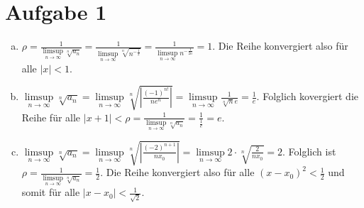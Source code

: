 \documentclass{article}
\begin{document}
    \section*{Aufgabe 1}
    \begin{enumerate}[(a)]
        \item $\rho = \frac{1}{\limsup\limits_{n\to \infty} \sqrt[n]{a_n}} = \frac{1}{\limsup\limits_{n\to \infty} \sqrt[n]{n^{-\frac{1}{2}}}} = \frac{1} {\limsup\limits_{n\to \infty} n^{-\frac{1}{2n}}} = 1.$ Die Reihe konvergiert also für alle $|x| < 1$.
        \item $\limsup\limits_{n\to \infty} \sqrt[n]{a_n} = \limsup\limits_{n\to \infty} \sqrt[n]{\left|\frac{(-1)^{n!}}{ne^n}\right|} = \limsup\limits_{n\to \infty} \frac{1}{\sqrt[n]{n}e} = \frac{1}{e}$. Folglich kovergiert die Reihe für alle $|x+1| < \rho = \frac{1}{\limsup\limits_{n\to \infty} \sqrt[n]{a_n}} = \frac{1}{\frac{1}{e}} = e$.
        \item $\limsup\limits_{n\to \infty} \sqrt[n]{a_n} = \limsup\limits_{n\to \infty} \sqrt[n]{\left|\frac{(-2)^{n+1}}{nx_0}\right|} = \limsup\limits_{n\to \infty} 2 \cdot \sqrt[n]{\frac{2}{nx_0}} = 2$. Folglich ist $\rho = \frac{1}{\limsup\limits_{n\to \infty} \sqrt[n]{a_n}} = \frac{1}{2}$.
        Die Reihe konvergiert also für alle $(x-x_0)^2 < \frac{1}{2}$ und somit für alle $|x-x_0| < \frac{1}{\sqrt{2}}$.
    \end{enumerate}
\end{document}

